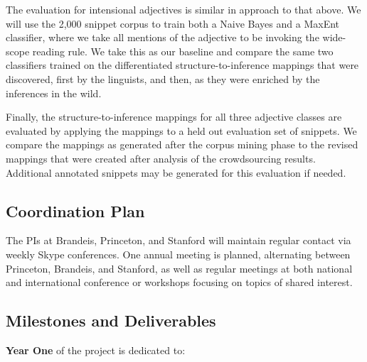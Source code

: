 \documentclass[10pt]{article}
\begin{document}

The evaluation for intensional adjectives is similar in approach to that above. We will use the 2,000 snippet corpus  to train both a Naive Bayes and a MaxEnt classifier, where we take all mentions of the adjective to be invoking the   wide-scope reading rule. We take this as our baseline and compare the same two classifiers trained on the differentiated structure-to-inference mappings that were discovered, first by the linguists, and then, as they were enriched by the inferences in the wild. 


Finally, the structure-to-inference mappings for all three adjective classes are evaluated by applying the mappings to a held out evaluation set of snippets. We compare the mappings as generated after the corpus mining phase to the revised mappings that were created after analysis of the crowdsourcing results. Additional annotated snippets may be generated for this evaluation if needed. 

\subsection{Coordination Plan}

The PIs at Brandeis, Princeton, and Stanford  will maintain regular contact
via weekly Skype conferences. One annual meeting is planned, alternating between Princeton, Brandeis, and Stanford, as well as regular  meetings at both  national and international conference or workshops focusing 
on topics of shared interest. 


\subsection{Milestones and Deliverables}


 
{\bf Year One} of the project is dedicated to: 
\end{document}
